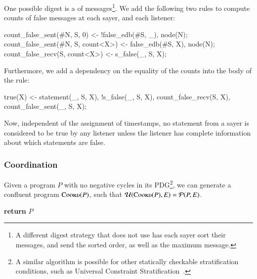 
One possible digest is a  of  messages\footnote{A different digest strategy that does not use  has each sayer sort their messages, and send the sorted order, as well as the maximum message.}.  We add the following two rules to compute counts of false messages at each sayer, and each listener:

\begin{Dedalus}
count_false_sent(#N, S, 0) <- 
  !false_edb(#S, _), node(N);
count_false_sent(#N, S, count<X>) <- 
  false_edb(#S, X), node(N);
count_false_recv(S, count<X>) <- s_false(_, S, X);
\end{Dedalus}

Furthermore, we add a dependency on the equality of the counts into the body of the  rule:

\begin{Dedalus}
true(X) <- statement(_, S, X), !s_false(_, S, X),
           count_false_recv(S, X),
           count_false_sent(_, S, X);
\end{Dedalus}

Now, independent of the assignment of timestamps, no statement from a sayer  is considered to be true by any listener unless the listener has complete information about which statements are false.

\subsubsection{Coordination}
\label{sec:coord}
Given a \lang program $P$ with no negative cycles in its PDG\footnote{A similar algorithm is possible for other statically checkable stratification conditions, such as Universal Constraint Stratification~\cite{ucs}.}, we can generate a confluent program $\textsc{Coord}(P)$, such that \linebreak $\mathcal{U}(\textsc{Coord}(P), E) = \mathcal{P}(P, E)$.

\begin{algorithmic}[1]
  \EndFor
   \label{alg:addrules} %
   \label{alg:lastfor}
  \EndFor
  \EndFor%
  \State \textbf{return} $P$
  \EndProcedure
\end{algorithmic}


